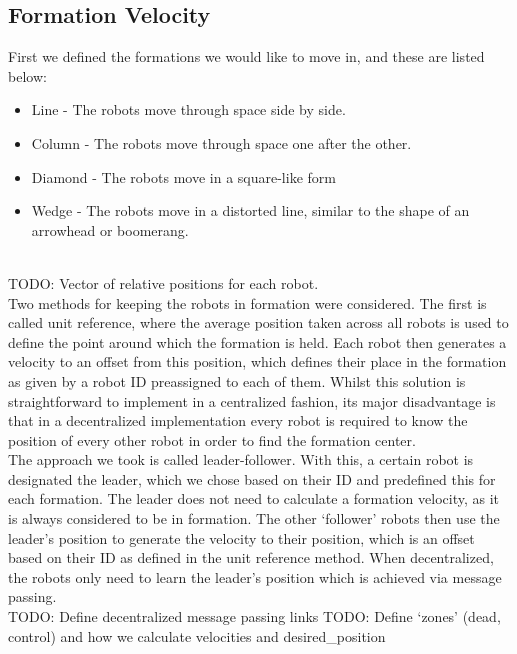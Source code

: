 \documentclass[letterpaper, 10 pt, conference]{ieeeconf}  %
\begin{document}
\subsection{Formation Velocity}

First we defined the formations we would like to move in, and these are listed below:

\begin{itemize}
\item Line - The robots move through space side by side.
\item Column - The robots move through space one after the other.
\item Diamond - The robots move in a square-like form
\item Wedge - The robots move in a distorted line, similar to the shape of an arrowhead or boomerang.
\end{itemize}~\\

TODO: Vector of relative positions for each robot. \\

Two methods for keeping the robots in formation were considered. The first is called unit reference, where the average position taken across all robots is used to define the point around which the formation is held. Each robot then generates a velocity to an offset from this position, which defines their place in the formation as given by a robot ID preassigned to each of them. Whilst this solution is straightforward to implement in a centralized fashion, its major disadvantage is that in a decentralized implementation every robot is required to know the position of every other robot in order to find the formation center. \\

The approach we took is called leader-follower. With this, a certain robot is designated the leader, which we chose based on their ID and predefined this for each formation. The leader does not need to calculate a formation velocity, as it is always considered to be in formation. The other `follower' robots then use the leader's position to generate the velocity to their position, which is an offset based on their ID as defined in the unit reference method. When decentralized, the robots only need to learn the leader's position which is achieved via message passing. \\

TODO: Define decentralized message passing links
TODO: Define `zones' (dead, control) and how we calculate velocities and desired\_position
\end{document}
